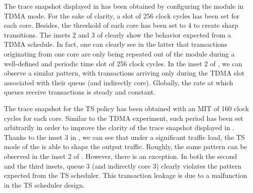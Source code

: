 The trace snapshot displayed in  has
been obtained by configuring the \schim module in TDMA mode. For the
sake of clarity, a slot of 256 clock cycles has been set for each
core. Besides, the threshold of each core has been set to 4 to
create sharp transitions.  The insets 2 and 3 of
 clearly show the behavior expected
from a TDMA schedule. In fact, one can clearly see in the latter that
transactions originating from one core are only being repeated out of
the \schim module during a well-defined and periodic time slot of 256 clock cycles. In the inset 2 of , we can
observe a similar pattern, with transactions arriving only during the
TDMA slot associated with their queue (and indirectly core). Globally,
the rate at which queues receive transactions is steady and constant.

The trace snapshot for the TS policy has been obtained with an MIT of
160 clock cycles for each core. Similar to the TDMA experiment, such
period has been set arbitrarily in order to improve the clarity of the
trace snapshot displayed in . Thanks to
the inset 3 in , we can see that under a significant traffic load, the TS mode of the \schim is able to shape
the output traffic. Roughly, the same pattern can be observed in the inset
2 of . However, there is an exception.
In both the second and the third insets, queue 3 (and indirectly core 3)
clearly violates the pattern expected from the TS scheduler. This transaction
leakage is due to a malfunction in the TS scheduler design.


